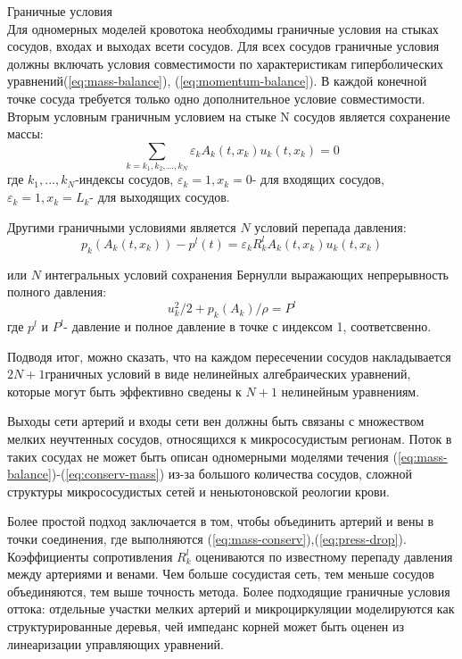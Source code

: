 \documentclass[a4paper, 14pt]{article}
\begin{document}
{Граничные условия}\\
Для одномерных моделей кровотока необходимы граничные условия на стыках сосудов, входах и выходах всети сосудов. Для всех сосудов граничные условия должны включать условия совместимости по характеристикам гиперболических уравнений(\ref{eq:mass-balance}), (\ref{eq:momentum-balance}).
В каждой конечной точке сосуда требуется только одно дополнительное условие совместимости.
Вторым условным граничным условием на стыке N сосудов является сохранение массы:
\begin{equation}
    \label{eq:mass-conserv}
    \sum_{k=k_1,k_2,...,k_N} \varepsilon_k A_k(t,x_k)u_k(t,x_k)=0
\end{equation}
где {$k_1,...,k_N$}-индексы сосудов, $\varepsilon_k=1, x_k=0$- для входящих сосудов,$\varepsilon_k=1, x_k=L_k$- для выходящих сосудов.

Другими граничными условиями является $N$ условий перепада давления:
\begin{equation}
    \label{eq:press-drop}
    p_k(A_k(t,x_k))-p^l(t)=\varepsilon_k R^l_k A_k(t,x_k)u_k(t,x_k)
\end{equation}

или $N$ интегральных условий сохранения Бернулли выражающих непрерывность полного давления:
\begin{equation}
    \label{eq:bernulli}
    u^2_k /2+p_k(A_k)/\rho=P^l
\end{equation}
где $p^l$ и $P^l$- давление и полное давление в точке с индексом 1, соответсвенно.

Подводя итог, можно сказать, что на каждом пересечении сосудов накладывается $2N + 1 $граничных условий в виде нелинейных алгебраических уравнений, которые могут быть 
эффективно сведены к $N + 1$ нелинейным уравнениям.

Выходы сети артерий и входы сети вен должны быть связаны с множеством мелких неучтенных сосудов, относящихся к микрососудистым регионам. Поток в таких сосудах не может быть описан одномерными моделями течения (\ref{eq:mass-balance})-(\ref{eq:conserv-mass}) из-за большого количества сосудов, сложной структуры микрососудистых сетей и неньютоновской реологии крови.

Более простой подход заключается в том, чтобы объединить артерий и вены в точки соединения, где выполняются (\ref{eq:mass-conserv}),(\ref{eq:press-drop}). Коэффициенты сопротивления $ R^l_k$ оцениваются  по известному перепаду давления между артериями и венами. Чем больше сосудистая сеть, тем меньше сосудов объединяются, тем выше точность метода. Более подходящие граничные условия оттока: отдельные участки мелких артерий и микроциркуляции моделируются как структурированные деревья, чей импеданс корней может быть оценен из линеаризации управляющих уравнений.
\end{document}
